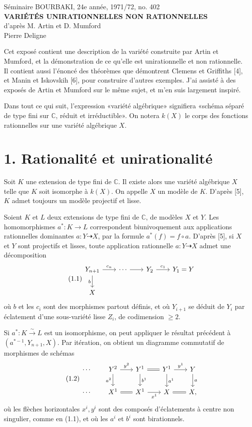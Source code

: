 \documentclass[10pt]{article}
\newcommand{\C}{\mathbb C}
\newcommand{\iso}{\xrightarrow{\sim}}
\begin{document}
\begin{center}
{\large Séminaire BOURBAKI, 24e année, 1971/72, no. 402}\\[0.4em]
{\Large\bfseries VARIÉTÉS UNIRATIONNELLES NON RATIONNELLES}\\[0.3em]
{\large d'après M. Artin et D. Mumford}\\[0.4em]
Pierre Deligne
\end{center}

Cet exposé contient une description de la variété construite par Artin et Mumford, et la démonstration de ce qu'elle est unirationnelle et non rationnelle. Il contient aussi l'énoncé des théorèmes que démontrent Clemens et Griffiths [4], et Manin et Iskovskih [6], pour construire d'autres exemples. J'ai assisté à des exposés de Artin et Mumford sur le même sujet, et m'en suis largement inspiré.

Dans tout ce qui suit, l'expression «variété algébrique» signifiera «schéma séparé de type fini sur \(\C\), réduit et irréductible». On notera \(k(X)\) le corps des fonctions rationnelles sur une variété algébrique \(X\).

\section*{1. Rationalité et unirationalité}

Soit \(K\) une extension de type fini de \(\C\). Il existe alors une variété algébrique \(X\) telle que \(K\) soit isomorphe à \(k(X)\). On appelle \(X\) un modèle de \(K\). D'après [5], \(K\) admet toujours un modèle projectif et lisse.

Soient \(K\) et \(L\) deux extensions de type fini de \(\C\), de modèles \(X\) et \(Y\). Les homomorphismes \(a^*:K\to L\) correspondent biunivoquement aux applications rationnelles dominantes \(a:Y\dashrightarrow X\), par la formule \(a^*(f)=f\circ a\). D'après [5], si \(X\) et \(Y\) sont projectifs et lisses, toute application rationnelle \(a:Y\dashrightarrow X\) admet une décomposition
\[
\tag{1.1}
\begin{tikzcd}[column sep=2.0em,row sep=1.8em]
Y_{n+1}\arrow[r,"c_n"]\arrow[d,"b"']&\cdots\arrow[r]&Y_2\arrow[r,"c_1"]&Y_1=Y\\
X&&&
\end{tikzcd}
\]
où \(b\) et les \(c_i\) sont des morphismes partout définis, et où \(Y_{i+1}\) se déduit de \(Y_i\) par éclatement d'une sous-variété lisse \(Z_i\), de codimension \(\ge2\).

Si \(a^*:K\iso L\) est un isomorphisme, on peut appliquer le résultat précédent à \((a^{*-1},Y_{n+1},X)\). Par itération, on obtient un diagramme commutatif de morphismes de schémas
\[
\tag{1.2}
\begin{tikzcd}[column sep=1.8em,row sep=1.8em]
\cdots & Y^2 \arrow[r,"y^2"] \arrow[d,"a^2"'] & Y^1 \arrow[r,equal] \arrow[d,"b^1"] & Y^1 \arrow[r,"y^1"]\arrow[d,"a^1"] & Y \arrow[d,"a"]\\
\cdots & X^1 \arrow[r,equal] & X^1 \arrow[r,"x^1"'] & X \arrow[r,equal] & X,
\end{tikzcd}
\]
où les flèches horizontales \(x^i,y^i\) sont des composés d'éclatements à centre non singulier, comme en (1.1), et où les \(a^i\) et \(b^i\) sont birationnels.
\end{document}
